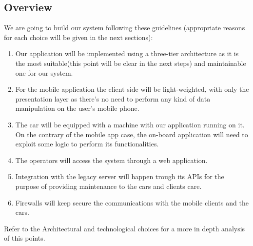 \documentclass[]{article}
\begin{document}
\subsection{Overview}\label{overview}

We are going to build our system following these guidelines (appropriate
reasons for each choice will be given in the next sections):

\begin{enumerate}
\def\labelenumi{\arabic{enumi}.}
\item
  Our application will be implemented using a three-tier architecture as
  it is the most suitable(this point will be clear in the next steps)
  and maintainable one for our system.
\item
  For the mobile application the client side will be light-weighted,
  with only the presentation layer as there's no need to perform any
  kind of data manipulation on the user's mobile phone.
\item
  The car will be equipped with a machine with our application running
  on it. On the contrary of the mobile app case, the on-board
  application will need to exploit some logic to perform its
  functionalities.
\item
  The operators will access the system through a web application.
\item
  Integration with the legacy server will happen trough its APIs for the
  purpose of providing maintenance to the cars and clients care.
\item
  Firewalls will keep secure the communications with the mobile clients
  and the cars.
\end{enumerate}

Refer to the Architectural and technological choices for a more in depth
analysis of this points.
\end{document}
